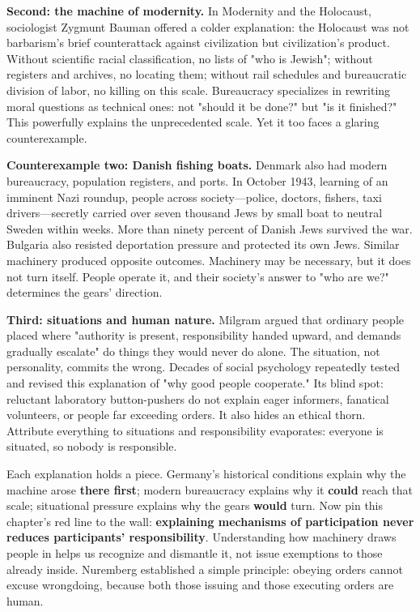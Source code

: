 \textbf{Second: the machine of modernity.} In Modernity and the Holocaust, sociologist Zygmunt Bauman offered a colder explanation: the Holocaust was not barbarism's brief counterattack against civilization but civilization's product. Without scientific racial classification, no lists of "who is Jewish"; without registers and archives, no locating them; without rail schedules and bureaucratic division of labor, no killing on this scale. Bureaucracy specializes in rewriting moral questions as technical ones: not "should it be done?" but "is it finished?" This powerfully explains the unprecedented scale. Yet it too faces a glaring counterexample.

\textbf{Counterexample two: Danish fishing boats.} Denmark also had modern bureaucracy, population registers, and ports. In October 1943, learning of an imminent Nazi roundup, people across society---police, doctors, fishers, taxi drivers---secretly carried over seven thousand Jews by small boat to neutral Sweden within weeks. More than ninety percent of Danish Jews survived the war. Bulgaria also resisted deportation pressure and protected its own Jews. Similar machinery produced opposite outcomes. Machinery may be necessary, but it does not turn itself. People operate it, and their society's answer to "who are we?" determines the gears' direction.

\textbf{Third: situations and human nature.} Milgram argued that ordinary people placed where "authority is present, responsibility handed upward, and demands gradually escalate" do things they would never do alone. The situation, not personality, commits the wrong. Decades of social psychology repeatedly tested and revised this explanation of "why good people cooperate." Its blind spot: reluctant laboratory button-pushers do not explain eager informers, fanatical volunteers, or people far exceeding orders. It also hides an ethical thorn. Attribute everything to situations and responsibility evaporates: everyone is situated, so nobody is responsible.

Each explanation holds a piece. Germany's historical conditions explain why the machine arose \textbf{there first}; modern bureaucracy explains why it \textbf{could} reach that scale; situational pressure explains why the gears \textbf{would} turn. Now pin this chapter's red line to the wall: \textbf{explaining mechanisms of participation never reduces participants' responsibility}. Understanding how machinery draws people in helps us recognize and dismantle it, not issue exemptions to those already inside. Nuremberg established a simple principle: obeying orders cannot excuse wrongdoing, because both those issuing and those executing orders are human.

